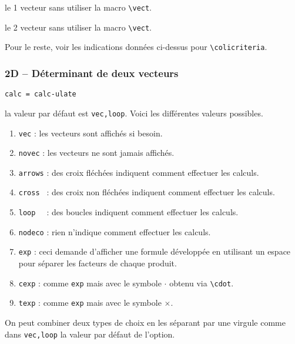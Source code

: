 \documentclass[12pt,a4paper]{article}
\theoremstyle{definition}
\newcommand\env[1]{\texttt{#1}}
\newcommand\macro[1]{\env{\textbackslash{}#1}}
\newcommand\mwhyprefix[2]{%
    \texttt{#1 = #1-#2}%
}
\begin{document}
 le 1\ier{} vecteur sans utiliser la macro \macro{vect}.

 le 2\ieme{} vecteur sans utiliser la macro \macro{vect}.

\medskip

Pour le reste, voir les indications données ci-dessus pour \macro{colicriteria}.


\subsubsection{2D -- Déterminant de deux vecteurs}



 \hfill \mwhyprefix{calc}{ulate}


\IDoption{} la valeur par défaut est \verb+vec,loop+. Voici les différentes valeurs possibles.
\begin{enumerate}
    \item \verb+vec+ : les vecteurs sont affichés si besoin.

    \item \verb+novec+ : les vecteurs ne sont jamais affichés.

    \medskip
    
    \item \verb+arrows+ : des croix fléchées indiquent comment effectuer les calculs.

    \item \verb+cross + : des croix non fléchées indiquent comment effectuer les calculs.

    \item \verb+loop  + : des boucles indiquent comment effectuer les calculs.

    \item \verb+nodeco+ : rien n'indique comment effectuer les calculs.

    \medskip

    \item \verb+exp+ : ceci demande d'afficher une formule développée en utilisant un espace pour séparer les facteurs de chaque produit.

    \item \verb+cexp+ : comme \verb+exp+ mais avec le symbole $\cdot$ obtenu via \macro{cdot}.

    \item \verb+texp+ : comme \verb+exp+ mais avec le symbole $\times$.
\end{enumerate}

            On peut combiner deux types de choix en les séparant par une virgule comme dans \verb+vec,loop+ la valeur par défaut de l'option.
\end{document}
